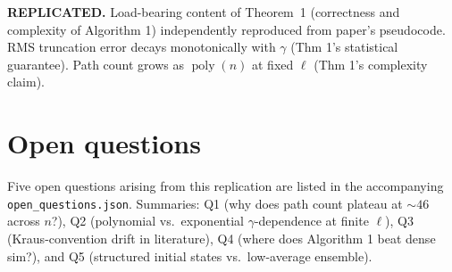 \documentclass[11pt]{article}
\begin{document}
\textbf{REPLICATED.}  Load-bearing content of Theorem~1 (correctness and complexity
of Algorithm 1) independently reproduced from paper's pseudocode.  RMS truncation
error decays monotonically with $\gamma$ (Thm 1's statistical guarantee).
Path count grows as $\operatorname{poly}(n)$ at fixed $\ell$ (Thm 1's complexity
claim).

\section{Open questions}

Five open questions arising from this replication are listed in the accompanying
\texttt{open\_questions.json}.  Summaries:
Q1 (why does path count plateau at $\sim 46$ across $n$?),
Q2 (polynomial vs.\ exponential $\gamma$-dependence at finite $\ell$),
Q3 (Kraus-convention drift in literature),
Q4 (where does Algorithm 1 beat dense sim?), and
Q5 (structured initial states vs.\ low-average ensemble).
\end{document}

